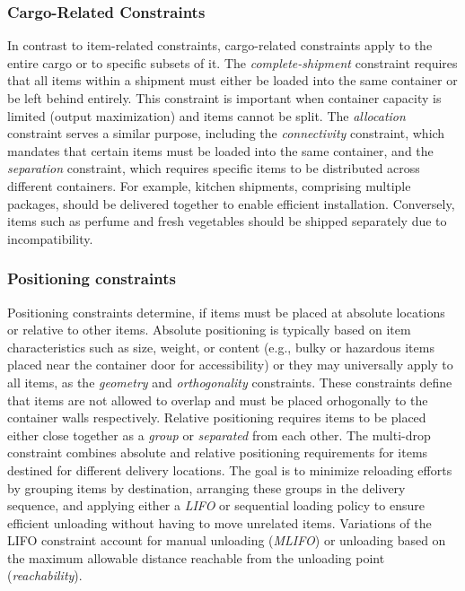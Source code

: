\subsubsection{Cargo-Related Constraints}
In contrast to item-related constraints, cargo-related constraints apply to
the entire cargo or to specific subsets of it. The \textit{complete-shipment} constraint
requires that all items within a shipment must either be loaded into the same
container or be left behind entirely. This constraint is important
when container capacity is limited (output maximization) and items
cannot be split. The \textit{allocation} constraint serves a similar purpose,
including the \textit{connectivity} constraint, which mandates that
certain items must be loaded into the same container, and the
\textit{separation} constraint, which requires specific items to
be distributed across different containers. For example, kitchen
shipments, comprising multiple packages, should be delivered together
to enable efficient installation. Conversely, items such as perfume and fresh
vegetables should be shipped separately due to incompatibility.

\subsubsection{Positioning constraints}

Positioning constraints determine, if items must be placed at
absolute locations or relative to other items. Absolute positioning is
typically based on item characteristics such as size, weight, or
content (e.g., bulky or hazardous items placed near the container door for accessibility) or
they may universally apply to all items, as the \textit{geometry} and
\textit{orthogonality} constraints. These constraints define that items are not allowed to overlap
and must be placed orhogonally to the container walls respectively.
Relative positioning requires items to be placed either close together as a \textit{group} or
\textit{separated} from each other.
The multi-drop constraint combines absolute and relative positioning requirements for items
destined for different delivery locations. The goal is to minimize reloading efforts by grouping items
by destination, arranging these groups in the delivery sequence, and applying either a \textit{\gls{LIFO}}
or sequential loading policy to ensure efficient unloading without having to move unrelated items.
Variations of the \gls{LIFO} constraint account for manual unloading (\textit{\gls{MLIFO}}) or unloading based on the
maximum allowable distance reachable from the unloading point (\textit{reachability}).

